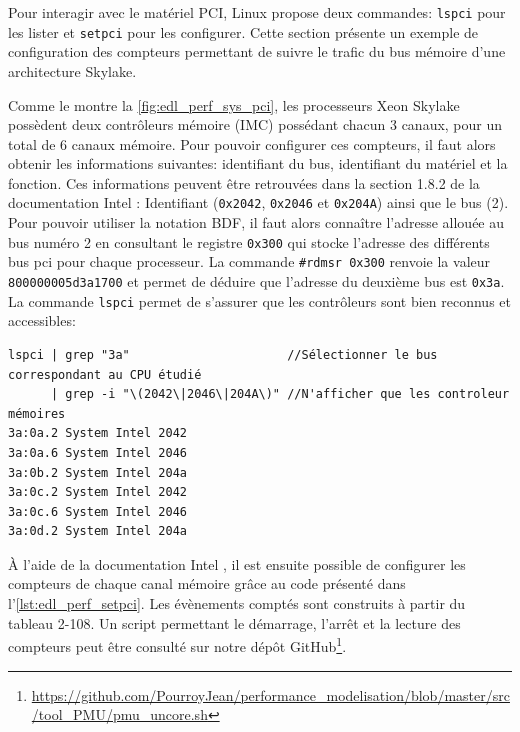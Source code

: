     Pour interagir avec le matériel PCI, Linux propose deux commandes: \verb|lspci| pour les lister et \verb|setpci| pour les configurer. Cette section présente un exemple de configuration des compteurs permettant de suivre le trafic du bus mémoire d'une architecture Skylake. 
    
    
    
    Comme le montre la \autoref{fig:edl_perf_sys_pci}, les processeurs Xeon Skylake possèdent deux contrôleurs mémoire (IMC) possédant chacun 3 canaux, pour un total de 6 canaux mémoire. Pour pouvoir configurer ces compteurs, il faut alors obtenir les informations suivantes: identifiant du bus, identifiant du matériel et la fonction. Ces informations peuvent être retrouvées dans la section 1.8.2 de la documentation Intel \cite{Intel2017b}: Identifiant (\verb|0x2042|, \verb|0x2046| et \verb|0x204A|) ainsi que le bus  (2). Pour pouvoir utiliser la notation BDF, il faut alors connaître l'adresse allouée au bus numéro 2 en consultant le registre \verb|0x300| qui stocke l'adresse des différents bus pci pour chaque processeur. La commande \verb|#rdmsr 0x300| renvoie la valeur \verb|800000005d3a1700| et permet de déduire que l'adresse du deuxième bus est \verb|0x3a|. La commande \verb|lspci| permet de s'assurer que les contrôleurs sont bien reconnus et accessibles:
\begin{verbatim}
lspci | grep "3a"                      //Sélectionner le bus correspondant au CPU étudié
      | grep -i "\(2042\|2046\|204A\)" //N'afficher que les controleur mémoires
3a:0a.2 System Intel 2042 
3a:0a.6 System Intel 2046 
3a:0b.2 System Intel 204a 
3a:0c.2 System Intel 2042
3a:0c.6 System Intel 2046 
3a:0d.2 System Intel 204a
\end{verbatim}
    
    À l'aide de la documentation Intel \cite{Intel2017b}, il est ensuite possible de configurer les compteurs de chaque canal mémoire grâce au code présenté dans l'\autoref{lst:edl_perf_setpci}. Les évènements comptés sont construits à partir du tableau 2-108. Un script permettant le démarrage, l'arrêt et la lecture des compteurs peut être consulté sur notre dépôt GitHub\footnote{\url{https://github.com/PourroyJean/performance_modelisation/blob/master/src/tool_PMU/pmu_uncore.sh}}. 

